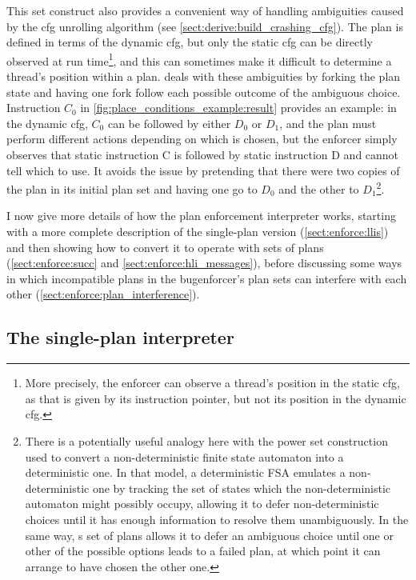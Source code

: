 This set construct also provides a convenient way of handling
ambiguities caused by the \gls{cfg} unrolling algorithm (see
\autoref{sect:derive:build_crashing_cfg}).  The plan is defined in
terms of the \gls{dynamic cfg}, but only the \gls{static cfg} can be
directly observed at run time\footnote{More precisely, the enforcer
  can observe a thread's position in the \gls{static cfg}, as that is
  given by its instruction pointer, but not its position in the
  \gls{dynamic cfg}.}\!\hspace{-.1ex}\!, and this can sometimes make
it difficult to determine a thread's position within a plan.
{\Technique} deals with these ambiguities by forking the plan state
and having one fork follow each possible outcome of the ambiguous
choice.  Instruction $C_0$ in
\autoref{fig:place_conditions_example:result} provides an example: in
the dynamic \gls{cfg}, $C_0$ can be followed by either $D_0$ or $D_1$,
and the plan must perform different actions depending on which is
chosen, but the enforcer simply observes that static instruction C is
followed by static instruction D and cannot tell which to use.  It
avoids the issue by pretending that there were two copies of the plan
in its initial plan set and having one go to $D_0$ and the other to
$D_1$\footnote{There is a potentially useful analogy here with the
  power set construction used to convert a non-deterministic finite
  state automaton into a deterministic one.  In that model, a
  deterministic FSA emulates a non-deterministic one by tracking the
  set of states which the non-deterministic automaton might possibly
  occupy, allowing it to defer non-deterministic choices until it has
  enough information to resolve them unambiguously.  In the same way,
  {\technique}s set of plans allows it to defer an ambiguous choice
  until one or other of the possible options leads to a failed plan,
  at which point it can arrange to have chosen the other
  one.}\!\hspace{-.1ex}\!.

I now give more details of how the plan enforcement interpreter works,
starting with a more complete description of the single-plan version
(\autoref{sect:enforce:llis}) and then showing how to convert it to
operate with sets of plans (\autoref{sect:enforce:succ} and
\autoref{sect:enforce:hli_messages}), before discussing some ways in
which incompatible plans in the \gls{bugenforcer}'s plan sets can
interfere with each other (\autoref{sect:enforce:plan_interference}).

\subsection{The single-plan interpreter}
\label{sect:enforce:llis}

